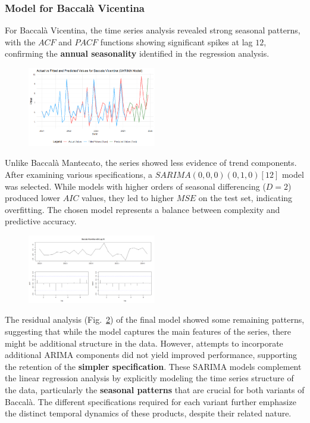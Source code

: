\documentclass[10pt,twocolumn,letterpaper]{article}
\begin{document}
\subsubsection{Model for Baccalà Vicentina}
For Baccalà Vicentina, the time series analysis revealed strong seasonal patterns, with the $ACF$ and $PACF$ functions showing significant spikes at lag $12$, confirming the \textbf{annual seasonality} identified in the regression analysis. 
\begin{figure}[H]
    \centering
    \includegraphics[width=0.5\textwidth]{PlotsBEFD/PRED_SARIMA_VIC.png} 
    \caption{}
    \label{fig:PRED_SARIMA_VIC}
\end{figure}
Unlike Baccalà Mantecato, the series showed less evidence of trend components.
After examining various specifications, a $SARIMA(0,0,0)(0,1,0)[12]$ model was selected.
While models with higher orders of seasonal differencing ($D=2$) produced lower $AIC$ values, they led to higher $MSE$ on the test set, indicating overfitting. The chosen model represents a balance between complexity and predictive accuracy.
\begin{figure}[H]
    \centering
    \includegraphics[width=0.5\textwidth]{PlotsBEFD/ACF_VIC_LAG12.png} 
    \caption{}
    \label{fig:ACF_VIC_LAG12}
\end{figure}
The residual analysis (Fig.~\ref{fig:ACF_VIC_LAG12}) of the final model showed some remaining patterns, suggesting that while the model captures the main features of the series, there might be additional structure in the data. However, attempts to incorporate additional ARIMA components did not yield improved performance, supporting the retention of the \textbf{simpler specification}.
These SARIMA models complement the linear regression analysis by explicitly modeling the time series structure of the data, particularly the \textbf{seasonal patterns} that are crucial for both variants of Baccalà. The different specifications required for each variant further emphasize the distinct temporal dynamics of these products, despite their related nature.
\end{document}
